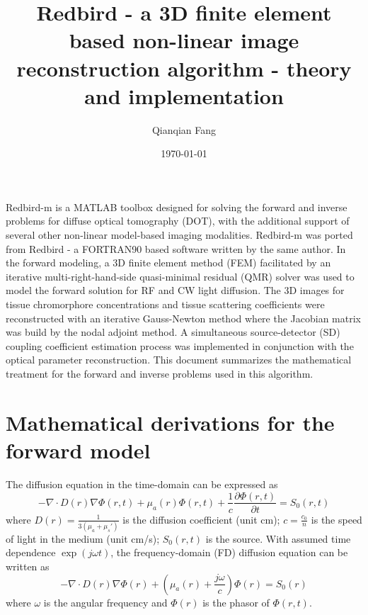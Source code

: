 \documentclass{article}
\title{Redbird \-- a 3D finite element based non-linear image reconstruction algorithm \-- theory and implementation}
\author{Qianqian Fang}
\date{\today}
\begin{document}
\maketitle              %

Redbird-m is a MATLAB toolbox designed for solving the forward and inverse
problems for diffuse optical tomography (DOT), with the additional support of 
several other non-linear model-based imaging modalities. Redbird-m was ported from 
Redbird - a FORTRAN90 based software written by the same author.
In the forward modeling, a 3D finite element method (FEM)
facilitated by an iterative multi-right-hand-side quasi-minimal residual (QMR) solver was used to model
the forward solution for RF and CW light diffusion. The 3D images for tissue chromorphore 
concentrations and tissue scattering coefficients were
reconstructed with an iterative Gauss-Newton method where the
Jacobian matrix was build by the nodal adjoint method. A simultaneous 
source-detector (SD) coupling coefficient estimation process was 
implemented in conjunction with the optical parameter reconstruction. 
This document summarizes the mathematical treatment for the forward 
and inverse problems used in this algorithm.

\section{Mathematical derivations for the forward model}
The diffusion equation in the time-domain can be expressed as
\begin{equation}
\label{eq:diffusionTD} -\nabla\cdot
D(r)\nabla\Phi(r,t)+\mu_a(r)\Phi(r,t)+\frac{1}{c}\frac{\partial
\Phi(r,t)}{\partial t}=S_0(r,t)
\end{equation}
where $D(r)=\frac{1}{3(\mu_a+\mu_s')}$ is the diffusion
coefficient (unit cm); $c=\frac{c_0}{n}$ is the speed of light in the
medium (unit cm/s); $S_0(r,t)$ is the source. With assumed time dependence
$\exp(j\omega t)$, the frequency-domain (FD) diffusion equation can be
written as
\begin{equation}
\label{eq:diffusionFD} -\nabla\cdot
D(r)\nabla\Phi(r)+\left(\mu_a(r)+\frac{j\omega}{c}\right)\Phi(r)=S_0(r)
\end{equation}
where $\omega$ is the angular frequency and $\Phi(r)$ is the
phasor of $\Phi(r,t)$.
\end{document}
